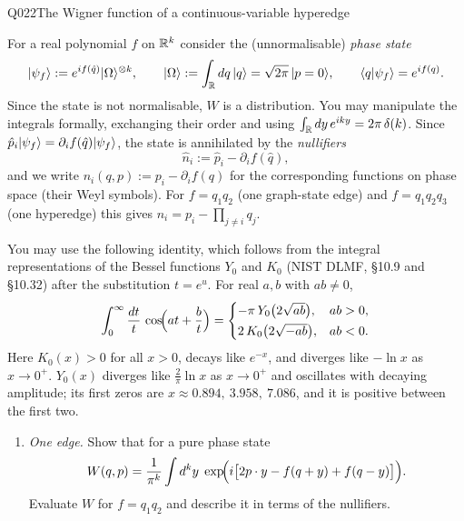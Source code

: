 \begin{entry}{Q022}{The Wigner function of a continuous-variable hyperedge}
\begin{problem}
For a real polynomial $f$ on $\mathbb{R}^{k}$ consider the (unnormalisable) \emph{phase state}
\begin{equation}
  \lvert \psi_f \rangle:=e^{if(\hat q)}\lvert \Omega \rangle^{\otimes k},
  \qquad
  \lvert \Omega \rangle:=\int_{\mathbb{R}}dq\,\lvert q \rangle=\sqrt{2\pi}\,\lvert p=0 \rangle,
  \qquad
  \langle q \vert \psi_f \rangle=e^{if(q)} .
  \label{q022:phase-state}
\end{equation}
Since the state is not normalisable, $W$ is a distribution. You may manipulate the
integrals formally, exchanging their order and using
$\int_{\mathbb{R}}dy\,e^{iky}=2\pi\,\delta(k)$. Since
$\hat p_i\lvert \psi_f \rangle=\partial_i f(\hat q)\lvert \psi_f \rangle$, the state is annihilated
by the \emph{nullifiers}
\begin{equation}
  \hat n_i:=\hat p_i-\partial_i f(\hat q),
  \label{q022:nullifier}
\end{equation}
and we write $n_i(q,p):=p_i-\partial_i f(q)$ for the corresponding functions on phase
space (their Weyl symbols). For $f=q_1q_2$ (one graph-state edge) and $f=q_1q_2q_3$ (one
hyperedge) this gives $n_i=p_i-\prod_{j\neq i}q_j$.

You may use the following identity, which follows from the integral
representations of the Bessel functions $Y_0$ and $K_0$ (NIST DLMF, \S10.9 and
\S10.32) after the substitution $t=e^{u}$. For real $a,b$ with $ab\neq0$,
\begin{equation}
  \int_{0}^{\infty}\frac{dt}{t}\,\cos\!\Bigl(at+\frac{b}{t}\Bigr)
  =\begin{cases}
     -\pi\,Y_0\bigl(2\sqrt{ab}\bigr), & ab>0,\\[2pt]
     2\,K_0\bigl(2\sqrt{-ab}\bigr), & ab<0 .
   \end{cases}
  \label{q022:bessel}
\end{equation}
Here $K_0(x)>0$ for all $x>0$, decays like $e^{-x}$, and diverges like $-\ln x$ as
$x\to0^{+}$. $Y_0(x)$ diverges like $\tfrac{2}{\pi}\ln x$ as $x\to0^{+}$ and oscillates
with decaying amplitude; its first zeros are $x\approx0.894,\ 3.958,\ 7.086$, and it is
positive between the first two.

\begin{enumerate}[label=\textbf{(\alph*)},leftmargin=*]
  \item \emph{One edge.} Show that for a pure phase state
        \begin{equation}
          W(q,p)=\frac{1}{\pi^{k}}\int d^{k}y\;
          \exp\!\Bigl(i\bigl[2p\cdot y-f(q+y)+f(q-y)\bigr]\Bigr).
          \label{q022:phase-wigner}
        \end{equation}
        Evaluate $W$ for $f=q_1q_2$ and describe it in terms of the nullifiers.


\end{enumerate}
\end{problem}
\end{entry}
